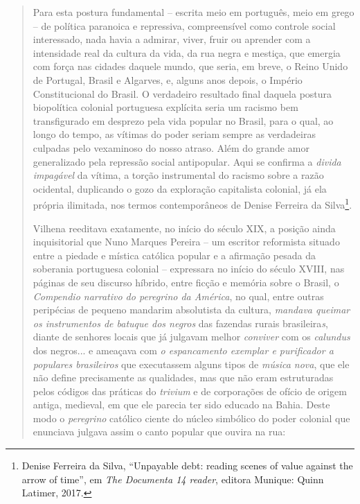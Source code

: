 \begin{quote}
Para esta postura fundamental -- escrita meio em português, meio em
grego -- de política paranoica e repressiva, compreensível como controle
social interessado, nada havia a admirar, viver, fruir ou aprender com a
intensidade real da cultura da vida, da rua negra e mestiça, que emergia
com força nas cidades daquele mundo, que seria, em breve, o Reino Unido
de Portugal, Brasil e Algarves, e, alguns anos depois, o Império
Constitucional do Brasil. O verdadeiro resultado final daquela postura
biopolítica colonial portuguesa explícita seria um racismo bem
transfigurado em desprezo pela vida popular no Brasil, para o qual, ao
longo do tempo, as vítimas do poder seriam sempre as verdadeiras
culpadas pelo vexaminoso do nosso atraso. Além do grande amor
generalizado pela repressão social antipopular. Aqui se confirma a
\emph{divida impagável} da vítima, a torção instrumental do racismo
sobre a razão ocidental, duplicando o gozo da exploração capitalista
colonial, já ela própria ilimitada, nos termos contemporâneos de Denise
Ferreira da Silva\footnote{Denise Ferreira da Silva, ``Unpayable debt:
  reading scenes of value against the arrow of time'', em \emph{The
  Documenta 14 reader}, editora Munique: Quinn Latimer, 2017.}.

Vilhena reeditava exatamente, no início do século XIX, a posição ainda
inquisitorial que Nuno Marques Pereira -- um escritor reformista situado
entre a piedade e mística católica popular e a afirmação pesada da
soberania portuguesa colonial -- expressara no início do século XVIII,
nas páginas de seu discurso híbrido, entre ficção e memória sobre o
Brasil, o \emph{Compendio narrativo do peregrino da América}, no qual,
entre outras peripécias de pequeno mandarim absolutista da cultura,
\emph{mandava queimar os instrumentos de batuque dos negros} das
fazendas rurais brasileira\emph{s}, diante de senhores locais que já
julgavam melhor \emph{conviver} com os \emph{calundus} dos negros... e
ameaçava com \emph{o espancamento exemplar e purificador a populares
brasileiros} que executassem alguns tipos de \emph{música nova}, que ele
não define precisamente as qualidades, mas que não eram estruturadas
pelos códigos das práticas do \emph{trivium} e de corporações de ofício
de origem antiga, medieval, em que ele parecia ter sido educado na
Bahia. Deste modo o \emph{peregrino} católico ciente do núcleo simbólico
do poder colonial que enunciava julgava assim o canto popular que ouvira
na rua:


\end{quote}
